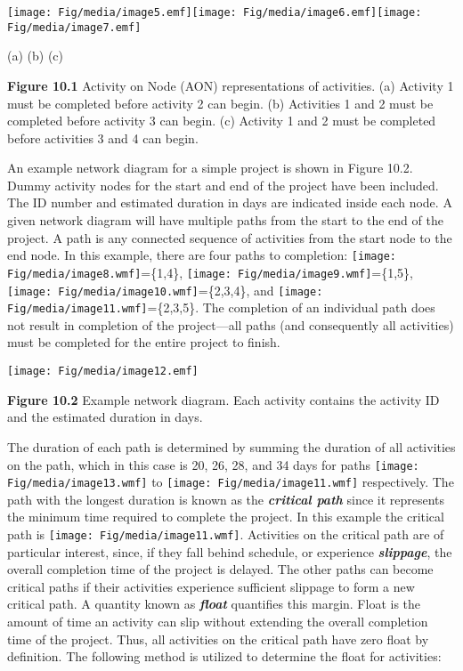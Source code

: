 \texttt{[image: Fig/media/image5.emf]}\texttt{[image: Fig/media/image6.emf]}\texttt{[image: Fig/media/image7.emf]}

(a) (b) (c)

\textbf{Figure 10.1} Activity on Node (AON) representations of
activities. (a) Activity 1 must be completed before activity 2 can
begin. (b) Activities 1 and 2 must be completed before activity 3 can
begin. (c) Activity 1 and 2 must be completed before activities 3 and 4
can begin.

An example network diagram for a simple project is shown in Figure 10.2.
Dummy activity nodes for the start and end of the project have been
included. The ID number and estimated duration in days are indicated
inside each node. A given network diagram will have multiple paths from
the start to the end of the project. A path is any connected sequence of
activities from the start node to the end node. In this example, there
are four paths to completion:
\texttt{[image: Fig/media/image8.wmf]}=\{1,4\},
\texttt{[image: Fig/media/image9.wmf]}=\{1,5\},
\texttt{[image: Fig/media/image10.wmf]}=\{2,3,4\},
and
\texttt{[image: Fig/media/image11.wmf]}=\{2,3,5\}.
The completion of an individual path does not result in completion of
the project---all paths (and consequently all activities) must be
completed for the entire project to finish.

\texttt{[image: Fig/media/image12.emf]}

\textbf{Figure 10.2} Example network diagram. Each activity contains the
activity ID and the estimated duration in days.

The duration of each path is determined by summing the duration of all
activities on the path, which in this case is 20, 26, 28, and 34 days
for paths
\texttt{[image: Fig/media/image13.wmf]}
to
\texttt{[image: Fig/media/image11.wmf]}
respectively. The path with the longest duration is known as the
\emph{\textbf{critical path}} since it represents the minimum time
required to complete the project. In this example the critical path is
\texttt{[image: Fig/media/image11.wmf]}.
Activities on the critical path are of particular interest, since, if
they fall behind schedule, or experience \emph{\textbf{slippage}}, the
overall completion time of the project is delayed. The other paths can
become critical paths if their activities experience sufficient slippage
to form a new critical path. A quantity known as \emph{\textbf{float}}
quantifies this margin. Float is the amount of time an activity can slip
without extending the overall completion time of the project. Thus, all
activities on the critical path have zero float by definition. The
following method is utilized to determine the float for activities:

